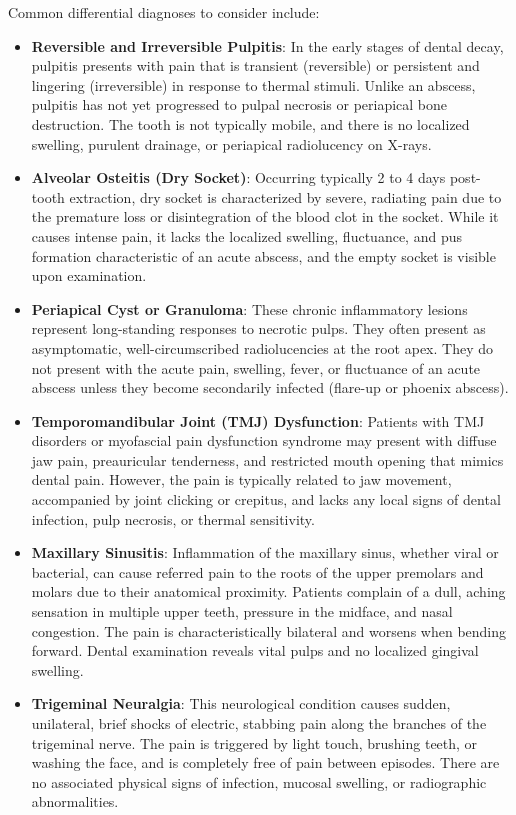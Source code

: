 Common differential diagnoses to consider include:
\begin{itemize}
  \item \textbf{Reversible and Irreversible Pulpitis}: In the early stages of dental decay, pulpitis presents with pain that is transient (reversible) or persistent and lingering (irreversible) in response to thermal stimuli. Unlike an abscess, pulpitis has not yet progressed to pulpal necrosis or periapical bone destruction. The tooth is not typically mobile, and there is no localized swelling, purulent drainage, or periapical radiolucency on X-rays.
  \item \textbf{Alveolar Osteitis (Dry Socket)}: Occurring typically 2 to 4 days post-tooth extraction, dry socket is characterized by severe, radiating pain due to the premature loss or disintegration of the blood clot in the socket. While it causes intense pain, it lacks the localized swelling, fluctuance, and pus formation characteristic of an acute abscess, and the empty socket is visible upon examination.
  \item \textbf{Periapical Cyst or Granuloma}: These chronic inflammatory lesions represent long-standing responses to necrotic pulps. They often present as asymptomatic, well-circumscribed radiolucencies at the root apex. They do not present with the acute pain, swelling, fever, or fluctuance of an acute abscess unless they become secondarily infected (flare-up or phoenix abscess).
  \item \textbf{Temporomandibular Joint (TMJ) Dysfunction}: Patients with TMJ disorders or myofascial pain dysfunction syndrome may present with diffuse jaw pain, preauricular tenderness, and restricted mouth opening that mimics dental pain. However, the pain is typically related to jaw movement, accompanied by joint clicking or crepitus, and lacks any local signs of dental infection, pulp necrosis, or thermal sensitivity.
  \item \textbf{Maxillary Sinusitis}: Inflammation of the maxillary sinus, whether viral or bacterial, can cause referred pain to the roots of the upper premolars and molars due to their anatomical proximity. Patients complain of a dull, aching sensation in multiple upper teeth, pressure in the midface, and nasal congestion. The pain is characteristically bilateral and worsens when bending forward. Dental examination reveals vital pulps and no localized gingival swelling.
  \item \textbf{Trigeminal Neuralgia}: This neurological condition causes sudden, unilateral, brief shocks of electric, stabbing pain along the branches of the trigeminal nerve. The pain is triggered by light touch, brushing teeth, or washing the face, and is completely free of pain between episodes. There are no associated physical signs of infection, mucosal swelling, or radiographic abnormalities.

\end{itemize}
